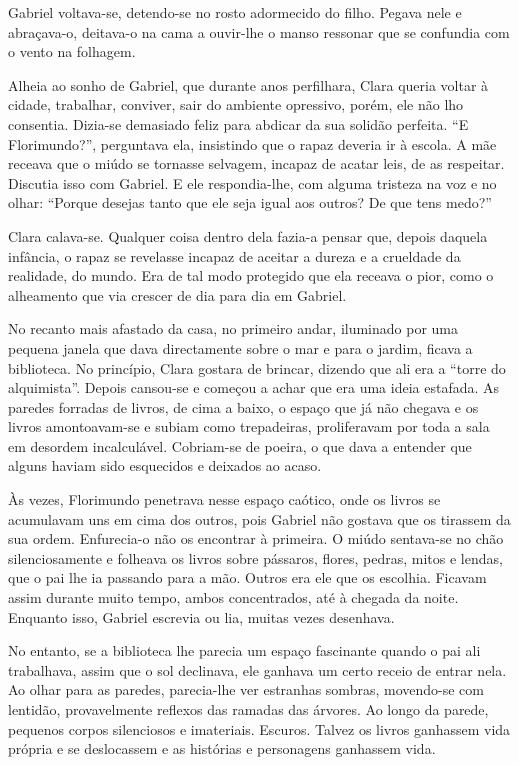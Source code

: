 Gabriel voltava-se, detendo-se no rosto adormecido do filho. Pegava nele
e abraçava-o, deitava-o na cama a ouvir-lhe o manso ressonar que se
confundia com o vento na folhagem.

Alheia ao sonho de Gabriel, que durante anos perfilhara, Clara queria
voltar à cidade, trabalhar, conviver, sair do ambiente opressivo, porém,
ele não lho consentia. Dizia-se demasiado feliz para abdicar da sua
solidão perfeita. ``E Florimundo?'', perguntava ela, insistindo que o
rapaz deveria ir à escola. A mãe receava que o miúdo se tornasse
selvagem, incapaz de acatar leis, de as respeitar. Discutia isso com
Gabriel. E ele respondia-lhe, com alguma tristeza na voz e no olhar:
``Porque desejas tanto que ele seja igual aos outros? De que tens medo?''

Clara calava-se. Qualquer coisa dentro dela fazia-a pensar que, depois
daquela infância, o rapaz se revelasse incapaz de aceitar a dureza e a
crueldade da realidade, do mundo. Era de tal modo protegido que ela
receava o pior, como o alheamento que via crescer de dia para dia em
Gabriel.

No recanto mais afastado da casa, no primeiro andar, iluminado por uma
pequena janela que dava directamente sobre o mar e para o jardim, ficava
a biblioteca. No princípio, Clara gostara de brincar, dizendo que ali
era a ``torre do alquimista''. Depois cansou-se e começou a achar que
era uma ideia estafada. As paredes forradas de livros, de cima a baixo,
o espaço que já não chegava e os livros amontoavam-se e subiam como
trepadeiras, proliferavam por toda a sala em desordem incalculável.
Cobriam-se de poeira, o que dava a entender que alguns haviam sido
esquecidos e deixados ao acaso.

Às vezes, Florimundo penetrava nesse espaço caótico, onde os livros se
acumulavam uns em cima dos outros, pois Gabriel não gostava que os
tirassem da sua ordem. Enfurecia-o não os encontrar à primeira. O miúdo
sentava-se no chão silenciosamente e folheava os livros sobre pássaros,
flores, pedras, mitos e lendas, que o pai lhe ia passando para a mão.
Outros era ele que os escolhia. Ficavam assim durante muito tempo, ambos
concentrados, até à chegada da noite. Enquanto isso, Gabriel escrevia ou
lia, muitas vezes desenhava.

No entanto, se a biblioteca lhe parecia um espaço fascinante quando o
pai ali trabalhava, assim que o sol declinava, ele ganhava um certo
receio de entrar nela. Ao olhar para as paredes, parecia-lhe ver
estranhas sombras, movendo-se com lentidão, provavelmente reflexos das
ramadas das árvores. Ao longo da parede, pequenos corpos silenciosos e
imateriais. Escuros. Talvez os livros ganhassem vida própria e se
deslocassem e as histórias e personagens ganhassem vida.

